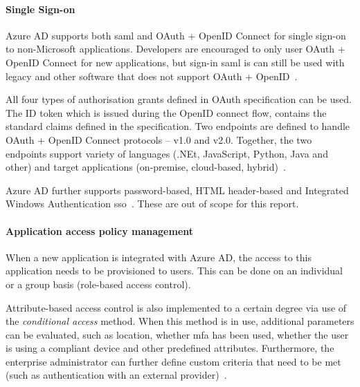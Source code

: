 
\paragraph{Single Sign-on} Azure AD supports both \acrshort{saml} and OAuth + OpenID Connect for single sign-on to non-Microsoft applications. Developers are encouraged to only user OAuth + OpenID Connect for new applications, but sign-in \acrshort{saml} is can still be used with legacy and other software that does not support OAuth + OpenID~\cite{barbkess2019SingleApplications}. 

All four types of authorisation grants defined in OAuth specification can be used. The ID token which is issued during the OpenID connect flow, contains the standard claims defined in the specification. Two endpoints are defined to handle OAuth + OpenID Connect protocols -- v1.0 and v2.0. Together, the two endpoints support variety of languages (.NEt, JavaScript, Python, Java and other) and target applications (on-premise, cloud-based, hybrid)~\cite{deGuzman2018AboutPlatform}.

Azure AD further supports password-based, HTML header-based  and Integrated Windows Authentication \acrlong{sso}~\cite{barbkess2019SingleApplications}. These are out of scope for this report.

\paragraph{Application access policy management} When a new application is integrated with Azure AD, the access to this application needs to be provisioned to users. This can be done on an individual or a group basis (role-based access control). 

Attribute-based access control is also implemented to a certain degree via use of the \textit{conditional access} method. When this method is in use, additional parameters can be evaluated, such as location, whether \acrshort{mfa} has been used, whether the user is using a compliant device and other predefined attributes. Furthermore, the enterprise administrator can further define custom criteria that need to be met (such as authentication with an external provider)~\cite{Vilcinskas2019WhatAccess}.